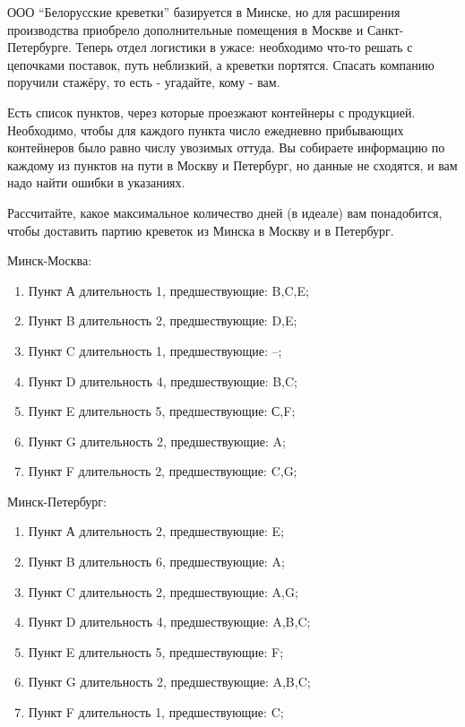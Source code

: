 \question
ООО “Белорусские креветки” базируется в Минске, но для расширения производства приобрело дополнительные помещения в Москве и Санкт-Петербурге. Теперь отдел логистики в ужасе: необходимо что-то решать с цепочками поставок, путь неблизкий, а креветки портятся. Спасать компанию поручили стажёру, то есть - угадайте, кому - вам.

Есть список пунктов, через которые проезжают контейнеры с продукцией. Необходимо, чтобы для каждого пункта число ежедневно прибывающих контейнеров было равно числу увозимых оттуда. Вы собираете информацию по каждому из пунктов на пути в Москву и Петербург, но данные не сходятся, и вам надо найти ошибки в указаниях.

Рассчитайте, какое максимальное количество дней (в идеале) вам понадобится, чтобы доставить партию креветок из Минска в Москву и в Петербург.


Минск-Москва:
\begin{enumerate}
\item Пункт А длительность 1, предшествующие: B,C,E;
\item Пункт B длительность 2, предшествующие: D,E;
\item Пункт C длительность 1, предшествующие: –;
\item Пункт D длительность 4, предшествующие: B,C;
\item Пункт E длительность 5, предшествующие: С,F;
\item Пункт G длительность 2, предшествующие: A;
\item Пункт F длительность 2, предшествующие: C,G;
\end{enumerate}
Минск-Петербург:
\begin{enumerate}
\item Пункт А длительность 2, предшествующие: E;
\item Пункт B длительность 6, предшествующие: A;
\item Пункт C длительность 2, предшествующие: A,G;
\item Пункт D длительность 4, предшествующие: A,B,C;
\item Пункт E длительность 5, предшествующие: F;
\item Пункт G длительность 2, предшествующие: A,B,C;
\item Пункт F длительность 1, предшествующие: C;
\end{enumerate}
